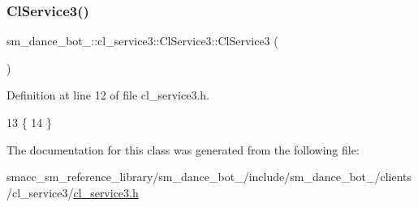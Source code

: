 \subsubsection{\texorpdfstring{Cl\+Service3()}{ClService3()}}
{\footnotesize\ttfamily sm\+\_\+dance\+\_\+bot\+\_\+::cl\+\_\+service3\+::\+Cl\+Service3\+::\+Cl\+Service3 (\begin{DoxyParamCaption}{ }\end{DoxyParamCaption})\hspace{0.3cm}{\ttfamily [inline]}}



Definition at line 12 of file cl\+\_\+service3.\+h.


\begin{DoxyCode}
13   \{
14   \}
\end{DoxyCode}


The documentation for this class was generated from the following file\+:\begin{DoxyCompactItemize}
\item 
smacc\+\_\+sm\+\_\+reference\+\_\+library/sm\+\_\+dance\+\_\+bot\+\_/include/sm\+\_\+dance\+\_\+bot\+\_/clients/cl\+\_\+service3/\hyperlink{2_2include_2sm__dance__bot__2_2clients_2cl__service3_2cl__service3_8h}{cl\+\_\+service3.\+h}\end{DoxyCompactItemize}
